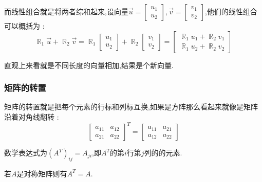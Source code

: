 \documentclass[UTF8,12pt]{ctexbook}
\newcommand{\transpose}{^T}
\DeclareMathOperator{\mathRealNumberCollection}{\mathbb{R}}
\begin{document}
{{{{{            而线性组合就是将两者综和起来,设向量$\vec{u} = \begin{bmatrix}
                    u_1 \\
                    u_2
                \end{bmatrix},\vec{v} = \begin{bmatrix}
                    v_1 \\
                    v_2
                \end{bmatrix}$,他们的线性组合可以概括为 : $$
                \mathRealNumberCollection_1\vec{u} + \mathRealNumberCollection_2\vec{v} = \mathRealNumberCollection_1\begin{bmatrix}
                    u_1 \\
                    u_2
                \end{bmatrix}
                +
                \mathRealNumberCollection_2\begin{bmatrix}
                    v_1 \\
                    v_2
                \end{bmatrix}
                =
                \begin{bmatrix}
                    \mathRealNumberCollection_1 u_1 + \mathRealNumberCollection_2 v_1 \\
                    \mathRealNumberCollection_1 u_2 + \mathRealNumberCollection_2 v_2
                \end{bmatrix}
            $$

    直观上来看就是不同长度的向量相加,结果是个新向量.
  }%

  \subsubsection{矩阵的转置}{
    矩阵的转置就是把每个元素的行标和列标互换,如果是方阵那么看起来就像是矩阵沿着对角线翻转 :
    $$
      \begin{bmatrix}
        a_{11} & a_{12} \\
        a_{21} & a_{22}
      \end{bmatrix}\transpose
      =
      \begin{bmatrix}
        a_{11} & a_{21} \\
        a_{12} & a_{22}
      \end{bmatrix}
    $$

    数学表达式为$(A\transpose)_{ij} = A_{ji}$,即$A^T$的第$i$行第$j$列的的元素.

    若$A$是对称矩阵则有$A\transpose = A$.

}}}}}
\end{document}
